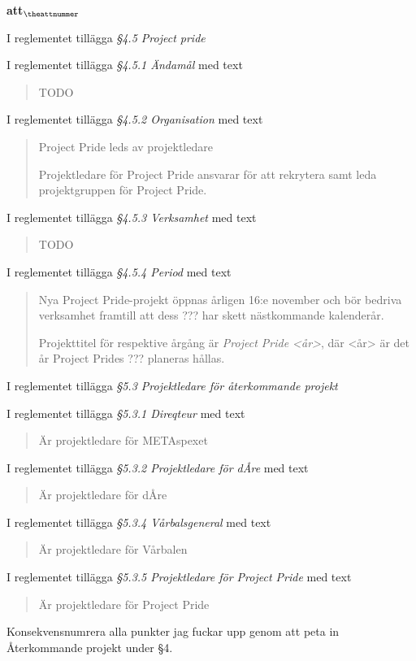 \documentclass[a4paper]{article}
\begin{document}
\begin{list}{\bf att$_{\theattnummer}$}{}

\item I reglementet tillägga \textit{\S4.5 Project pride}
\item I reglementet tillägga \textit{\S4.5.1 Ändamål} med text
    \begin{quote}
        TODO
    \end{quote}
\item I reglementet tillägga \textit{\S4.5.2 Organisation} med text
    \begin{quote}
        Project Pride leds av projektledare

        Projektledare för Project Pride ansvarar för att rekrytera samt leda projektgruppen för Project Pride.
    \end{quote}
\item I reglementet tillägga \textit{\S4.5.3 Verksamhet} med text
    \begin{quote}
        TODO
    \end{quote}
\item I reglementet tillägga \textit{\S4.5.4 Period} med text
    \begin{quote}
        Nya Project Pride-projekt öppnas årligen 16:e november och bör bedriva verksamhet framtill att dess ??? har skett nästkommande kalenderår.

        Projekttitel för respektive årgång är \textit{Project Pride <år>}, där <år> är det år Project Prides ??? planeras hållas.
    \end{quote}


\item I reglementet tillägga \textit{\S5.3 Projektledare för återkommande projekt}
\item I reglementet tillägga \textit{\S5.3.1 Direqteur} med text
    \begin{quote}
        Är projektledare för METAspexet
    \end{quote}
\item I reglementet tillägga \textit{\S5.3.2 Projektledare för dÅre} med text
    \begin{quote}
        Är projektledare för dÅre
    \end{quote}
\item I reglementet tillägga \textit{\S5.3.4 Vårbalsgeneral} med text
    \begin{quote}
        Är projektledare för Vårbalen
    \end{quote}
\item I reglementet tillägga \textit{\S5.3.5 Projektledare för Project Pride} med text
    \begin{quote}
        Är projektledare för Project Pride
    \end{quote}


\item Konsekvensnumrera alla punkter jag fuckar upp genom att peta in Återkommande projekt under \S4.
\end{list}
\end{document}
